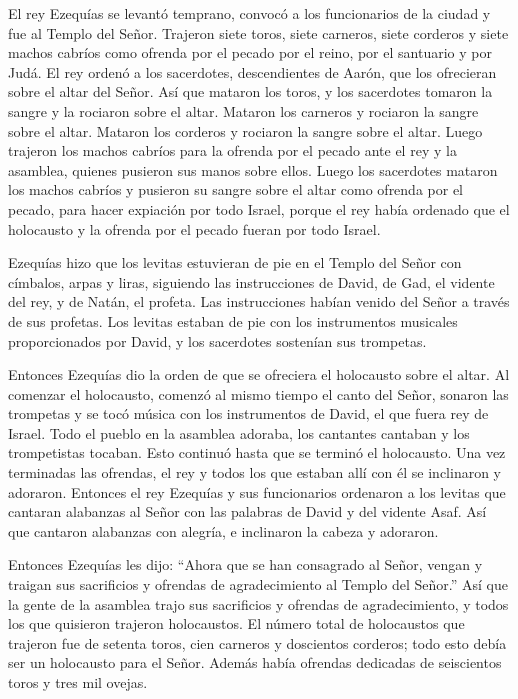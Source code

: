  El rey Ezequías se levantó temprano, convocó a los
funcionarios de la ciudad y fue al Templo del Señor. 
Trajeron siete toros, siete carneros, siete corderos y siete machos
cabríos como ofrenda por el pecado por el reino, por el santuario y por
Judá. El rey ordenó a los sacerdotes, descendientes de Aarón, que los
ofrecieran sobre el altar del Señor.  Así que mataron los
toros, y los sacerdotes tomaron la sangre y la rociaron sobre el altar.
Mataron los carneros y rociaron la sangre sobre el altar. Mataron los
corderos y rociaron la sangre sobre el altar.  Luego
trajeron los machos cabríos para la ofrenda por el pecado ante el rey y
la asamblea, quienes pusieron sus manos sobre ellos.  Luego
los sacerdotes mataron los machos cabríos y pusieron su sangre sobre el
altar como ofrenda por el pecado, para hacer expiación por todo Israel,
porque el rey había ordenado que el holocausto y la ofrenda por el
pecado fueran por todo Israel.

 Ezequías hizo que los levitas estuvieran de pie en el
Templo del Señor con címbalos, arpas y liras, siguiendo las
instrucciones de David, de Gad, el vidente del rey, y de Natán, el
profeta. Las instrucciones habían venido del Señor a través de sus
profetas.  Los levitas estaban de pie con los instrumentos
musicales proporcionados por David, y los sacerdotes sostenían sus
trompetas.

 Entonces Ezequías dio la orden de que se ofreciera el
holocausto sobre el altar. Al comenzar el holocausto, comenzó al mismo
tiempo el canto del Señor, sonaron las trompetas y se tocó música con
los instrumentos de David, el que fuera rey de Israel. 
Todo el pueblo en la asamblea adoraba, los cantantes cantaban y los
trompetistas tocaban. Esto continuó hasta que se terminó el holocausto.
 Una vez terminadas las ofrendas, el rey y todos los que
estaban allí con él se inclinaron y adoraron.  Entonces el
rey Ezequías y sus funcionarios ordenaron a los levitas que cantaran
alabanzas al Señor con las palabras de David y del vidente Asaf. Así que
cantaron alabanzas con alegría, e inclinaron la cabeza y adoraron.

 Entonces Ezequías les dijo: ``Ahora que se han consagrado
al Señor, vengan y traigan sus sacrificios y ofrendas de agradecimiento
al Templo del Señor.'' Así que la gente de la asamblea trajo sus
sacrificios y ofrendas de agradecimiento, y todos los que quisieron
trajeron holocaustos.  El número total de holocaustos que
trajeron fue de setenta toros, cien carneros y doscientos corderos; todo
esto debía ser un holocausto para el Señor.  Además había
ofrendas dedicadas de seiscientos toros y tres mil ovejas.


